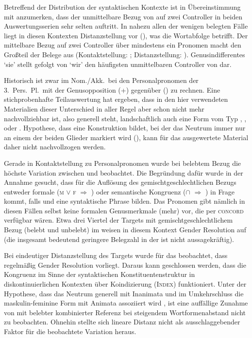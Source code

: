 Betreffend der Distribution der syntaktischen Kontexte ist in Übereinstimmung
mit \citet[624, Abb.~P~179]{ksw2} anzumerken, dass der unmittelbare Bezug von
 auf zwei Controller in beiden Auswertungsserien sehr selten
auftritt. In nahezu allen der wenigen belegten Fälle liegt in diesen Kontexten
Distanzstellung vor (), was die Wortabfolge
betrifft. Der mittelbare Bezug auf zwei Controller über mindestens ein Pronomen
macht den Großteil der Belege aus (Kontaktstellung: ;
Distanzstellung: ). Genus\-indifferentes
 `sie' stellt gefolgt von  `wir' den häufigsten
unmittelbaren Controller von  dar.

Historisch ist zwar im Nom./Akk.\ bei den Personalpronomen der 3.~Pers.\ Pl.\
mit der Genus\-opposition  (\M+\F) gegenüber  (\N) zu
rechnen. Eine stichprobenhafte Teilauswertung hat ergeben, dass in den hier
verwendeten Materialien dieser Unterschied in aller Regel aber schon nicht mehr
nachvollziehbar ist, also generell \norm{si} steht, landschaftlich auch eine
Form vom Typ
,
,
 oder
\autocites[vgl.][213--214]{paul2007}[369, 390--397]{ksw2}[482--483]{wmu1}.
\posscite[99]{askedal1973} Hypothese, dass \norm{si bėide} eine
Konstruktion bildet, bei der das Neutrum immer nur an einem der beiden Glieder
markiert wird (\q*{Monoflexion}), kann für das ausgewertete Material daher
nicht nachvollzogen werden.

Gerade in Kontaktstellung zu Personalpronomen wurde bei belebtem Bezug die
höchste Variation zwischen \norm{bėide} und \norm{bėidiu} beobachtet. Die
Begründung dafür wurde in der Annahme gesucht, dass für die Auflösung des
gemischtgeschlechtlichen Bezugs entweder formale (\textsc{m} $\lor$ \textsc{f}
$\Rightarrow$ \norm{-e}) oder semantische Kongruenz (\SM $\cap$ \SF
$\Rightarrow$ \norm{-iu}) in Frage kommt, falls \norm{si} und  eine
syntaktische Phrase bilden. Das Pronomen gibt nämlich in diesen Fällen selbst
keine formalen Genus\-merk\-male (mehr) vor, die per \textsc{concord} verfügbar
wären. Etwa drei Viertel der Targets mit gemischtgeschlechtlichem Bezug (belebt
und unbelebt) im \CAO{} weisen in diesem Kontext Gender Resolution auf (die
insgesamt bedeutend geringere Belegzahl in der \KC{} ist nicht aussagekräftig).

Bei eindeutiger Distanzstellung des Targets wurde für das \CAO{} beobachtet,
dass regel\-mäßig Gender Re\-solu\-tion vorliegt. Daraus kann geschlossen
werden, dass die Kongruenz im Sinne der syntaktischen Konstituentenstruktur in
diskontinuierlichen Kontexten über Koindizierung (\textsc{Index}) funktioniert.
Unter der Hypothese, dass das Neutrum generell mit Inanimata und im
Umkehrschluss die maskulin-feminine Form mit Animata assoziiert wird
\autocite[243--245]{askedal1973}, ist eine auffällige Zunahme von 
mit belebter kombinierter Referenz bei steigendem Wortformenabstand nicht zu
beobachten. Ohnehin stellte sich lineare Distanz nicht als ausschlaggebender
Faktor für die beob\-ach\-tete Variation heraus.

